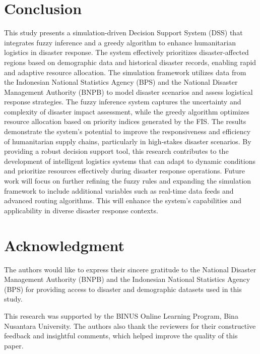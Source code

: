 \documentclass[journal,final,a4paper,twoside,11pt]{IEEEtran}
\begin{document}
\section{Conclusion}
This study presents a simulation-driven Decision Support System (DSS) that integrates fuzzy inference and a greedy algorithm to enhance humanitarian logistics in disaster response. The system effectively prioritizes disaster-affected regions based on demographic data and historical disaster records, enabling rapid and adaptive resource allocation.
The simulation framework utilizes data from the Indonesian National Statistics Agency (BPS) and the National Disaster Management Authority (BNPB) to model disaster scenarios and assess logistical response strategies. The fuzzy inference system captures the uncertainty and complexity of disaster impact assessment, while the greedy algorithm optimizes resource allocation based on priority indices generated by the FIS.
The results demonstrate the system's potential to improve the responsiveness and efficiency of humanitarian supply chains, particularly in high-stakes disaster scenarios. By providing a robust decision support tool, this research contributes to the development of intelligent logistics systems that can adapt to dynamic conditions and prioritize resources effectively during disaster response operations. Future work will focus on further refining the fuzzy rules and expanding the simulation framework to include additional variables such as real-time data feeds and advanced routing algorithms. This will enhance the system's capabilities and applicability in diverse disaster response contexts.

\section*{Acknowledgment}

The authors would like to express their sincere gratitude to the National Disaster Management Authority (BNPB) and the Indonesian National Statistics Agency (BPS) for providing access to disaster and demographic datasets used in this study. 

This research was supported by the BINUS Online Learning Program, Bina Nusantara University. The authors also thank the reviewers for their constructive feedback and insightful comments, which helped improve the quality of this paper.





 




\label{lastPage}
\end{document}
